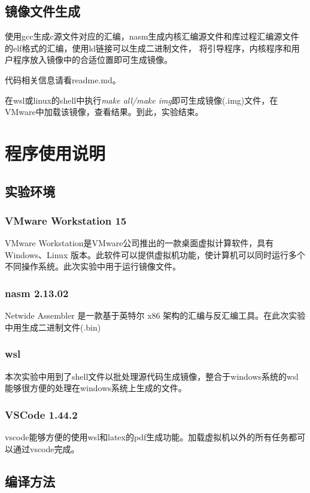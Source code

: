 \documentclass[a4paper, 11pt]{article} %
\newcounter{code}
\begin{document}
\subsection{镜像文件生成}


使用gcc生成c源文件对应的汇编，nasm生成内核汇编源文件和库过程汇编源文件的elf格式的汇编，使用ld链接可以生成二进制文件，
将引导程序，内核程序和用户程序放入镜像中的合适位置即可生成镜像。

代码相关信息请看readme.md。

在wsl或linux的shell中执行\textit{make all/make img}即可生成镜像(.img)文件，在VMware中加载该镜像，查看结果。到此，实验结束。

\section{程序使用说明}
\subsection{实验环境}

\subsubsection{VMware Workstation 15}
VMware Workstation是VMware公司推出的一款桌面虚拟计算软件，具有Windows、Linux 版本。此软件可以提供虚拟机功能，使计算机可以同时运行多个不同操作系统。此次实验中用于运行镜像文件。
\subsubsection{nasm 2.13.02}
Netwide Assembler 是一款基于英特尔 x86 架构的汇编与反汇编工具。在此次实验中用生成二进制文件(.bin)
\subsubsection{wsl}
本次实验中用到了shell文件以批处理源代码生成镜像，整合于windows系统的wsl能够很方便的处理在windows系统上生成的文件。
\subsubsection{VSCode 1.44.2}
vscode能够方便的使用wsl和latex的pdf生成功能。加载虚拟机以外的所有任务都可以通过vscode完成。

\subsection{编译方法}
\end{document}
